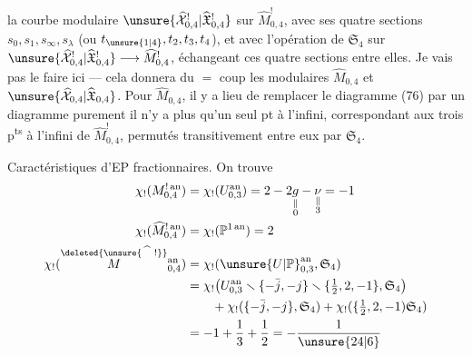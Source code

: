 la courbe modulaire $\unsure{\widehat{\mathcal X}^!_{0,4}|\widehat{\mathfrak X}^!_{0,4}}$ sur $\widehat M^!_{0,4}$, avec ses quatre sections $s_0,s_1,s_\infty,s_\lambda$ (ou $t_{\unsure{1|4}},t_2,t_3,t_4$), et avec l'opération de $\mathfrak S_4$  sur $\unsure{\widehat{\mathcal X}^!_{0,4}|\widehat{\mathfrak X}^!_{0,4}}\longrightarrow\widehat M^!_{0,4}$, échangeant ces quatre sections entre elles. Je vais pas le faire ici --- cela donnera du $=$ coup les  modulaires $\widehat M_{0,4}$ et $\unsure{\widehat{\mathcal X}_{0,4}|\widehat{\mathfrak X}_{0,4}}$. Pour $\widehat M_{0,4}$, il y a lieu de remplacer le diagramme (76) par un diagramme purement 
il n'y a plus qu'un seul pt à l'infini, correspondant aux trois p\textsuperscript{ts} à l'infini de $\widehat M^!_{0,4}$, permutés transitivement entre eux par $\mathfrak S_4$.

Caractéristiques d'EP fractionnaires. On trouve
\[
\begin{aligned}
\chi_!(M^{!\,\mathrm{an}}_{0,4})&=\chi_!(U^{\mathrm{an}}_{0,3})=2-2\underset{\substack{\Vert\\0}}{g}-\underset{\substack{\Vert\\3}}{\nu}=-1\\
\chi_!(\widehat M^{!\,\mathrm{an}}_{0,4})&=\chi_!(\mathbb P^{1\,\mathrm{an}})=2\\
\chi_!(\overset{\deleted{\unsure{\widehat{\phantom M}\,!}}}{M}{}^{\mathrm{an}}_{0,4})&=\chi_!(\unsure{U|\mathbb P}^{\mathrm{an}}_{0,3},\mathfrak S_4)\\
&=\chi_!\bigl(U^{\mathrm{an}}_{0,3}\smallsetminus\{-\bar j,-j\}\smallsetminus\{\tfrac12,2,-1\},\mathfrak S_4\bigr)\\
&\qquad+\chi_!(\{-\bar j,-j\},\mathfrak S_4)+\chi_!(\{\tfrac12,2,-1)\mathfrak S_4)\\
&=-1+\frac13+\frac12=-\frac1{\unsure{24|6}}
\end{aligned}
\]

